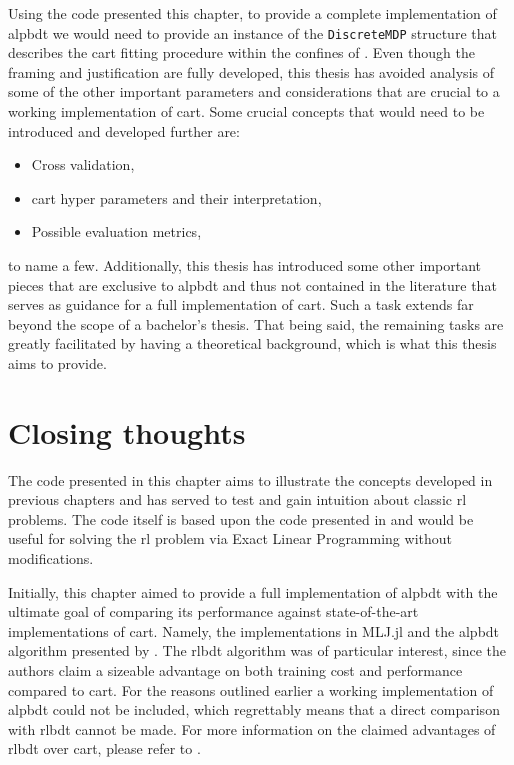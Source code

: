 Using the code presented this chapter, to provide a complete implementation of
\ac{alpbdt} we would need to provide an instance of the \lstinline{DiscreteMDP}
structure that describes the \ac{cart} fitting procedure within the confines of
. Even though the framing and justification are fully developed, this
thesis has avoided analysis of some of the other important parameters and
considerations that are crucial to a working implementation of \ac{cart}. Some
crucial concepts that would need to be introduced and developed further are:
\begin{itemize}
    \item Cross validation,
    \item \Ac{cart} hyper parameters and their interpretation,
    \item Possible evaluation metrics,
\end{itemize}
to name a few. Additionally, this thesis has introduced some other important
pieces that are exclusive to \ac{alpbdt} and thus not contained in the
literature that serves as guidance for a full implementation of \ac{cart}. Such
a task extends far beyond the scope of a bachelor's thesis. That being said, the
remaining tasks are greatly facilitated by having a theoretical background,
which is what this thesis aims to provide.

\section{Closing thoughts}

The code presented in this chapter aims to illustrate the concepts developed in
previous chapters and has served to test and gain intuition about classic
\ac{rl} problems. The code itself is based upon the code presented in
\cite{kochenderfer2022} and would be useful for solving the \ac{rl} problem via
Exact Linear Programming without modifications. 

Initially, this chapter aimed to provide a full implementation of \ac{alpbdt}
with the ultimate goal of comparing its performance against state-of-the-art
implementations of \ac{cart}. Namely, the implementations in MLJ.jl and the
\ac{alpbdt} algorithm presented by \citeauthor{xiong}. The \ac{rlbdt} algorithm
was of particular interest, since the authors claim a sizeable advantage on both
training cost and performance compared to \ac{cart}. For the reasons outlined
earlier a working implementation of \ac{alpbdt} could not be included, which
regrettably means that a direct comparison with \ac{rlbdt} cannot be made. For
more information on the claimed advantages of \ac{rlbdt} over cart, please refer
to \cite{xiong}.